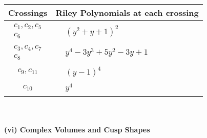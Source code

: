 \documentclass[1p]{elsarticle_modified}
\theoremstyle{definition}
\begin{document}
\begin{tabular}{m{50pt}|m{274pt}}
Crossings & \hspace{64pt}Riley Polynomials at each crossing \\
\hline $$\begin{aligned}c_{1},c_{2},c_{5}\\c_{6}\end{aligned}$$&$\begin{aligned}
&(y^2+y+1)^2
\end{aligned}$\\
\hline $$\begin{aligned}c_{3},c_{4},c_{7}\\c_{8}\end{aligned}$$&$\begin{aligned}
&y^4-3 y^3+5 y^2-3 y+1
\end{aligned}$\\
\hline $$\begin{aligned}c_{9},c_{11}\end{aligned}$$&$\begin{aligned}
&(y-1)^4
\end{aligned}$\\
\hline $$\begin{aligned}c_{10}\end{aligned}$$&$\begin{aligned}
&y^4
\end{aligned}$\\
\hline
\end{tabular}\\~\\
\newpage\flushleft \textbf{(vi) Complex Volumes and Cusp Shapes}
\end{document}
